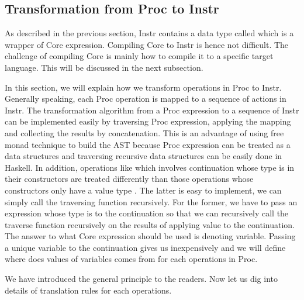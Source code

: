 \subsection{Transformation from Proc to Instr}
As described in the previous section, Instr contains a data type called  which is a wrapper of Core expression. Compiling Core to Instr is hence not difficult. The challenge of compiling Core is mainly how to compile it to a specific target language. This will be discussed in the next subsection.  

In this section, we will explain how we transform operations in Proc to Instr. Generally speaking, each Proc operation is mapped to a sequence of actions in Instr. The transformation algorithm from a Proc expression to a sequence of Instr can be implemented easily by traversing Proc expression, applying the mapping and collecting the results by concatenation. This is an advantage of using free monad technique to build the AST because Proc expression can be treated as a data structures and traversing recursive data structures can be easily done in Haskell. In addition, operations like  which involves continuation whose type is  in their constructors are treated differently than those operations whose constructors only have a value type . The latter is easy to implement, we can simply call the traversing function recursively. For the former, we have to pass an expression whose type is  to the continuation so that we can recursively call the traverse function recursively on the results of applying value to the continuation. The answer to what Core expression should be used is  denoting variable. Passing a unique variable to the continuation gives us  inexpensively and we will define where does values of variables comes from for each operations in Proc. 

We have introduced the general principle to the readers. Now let us dig into details of translation rules for each operations. 

